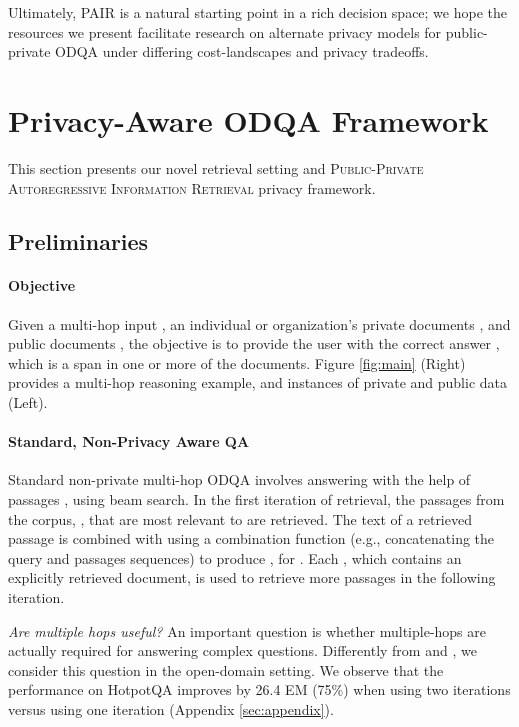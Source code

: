 \documentclass{article}
\renewcommand\cite{\citep}	\newcommand\shortcite{\citeyearpar}\newcommand\newcite{\citet}
\newcommand{\problemlongname}{\textsc{Public-Private Autoregressive Information Retrieval}\xspace}
\newcommand{\problemshortname}{\textsc{PAIR}\xspace}
\begin{document}
Ultimately, \problemshortname is a natural starting point in a rich decision space; we hope the resources we present facilitate research on alternate privacy models for public-private ODQA under differing cost-landscapes and privacy tradeoffs. 
 
\section{Privacy-Aware ODQA Framework}
\label{sec:method}
This section presents our novel retrieval setting and \problemlongname privacy framework.

\subsection{Preliminaries}
\paragraph{Objective} Given a multi-hop input , an individual or organization's private documents , and public documents , the objective is to provide the user with the correct answer , which is a span in one or more of the documents. Figure \ref{fig:main} (Right) provides a multi-hop reasoning example, and instances of private and public data (Left).

\paragraph{Standard, Non-Privacy Aware QA} Standard non-private multi-hop ODQA involves answering  with the help of passages , using beam search. In the first iteration of retrieval, the  passages from the corpus, , that are most relevant to  are retrieved. The text of a retrieved passage is combined with  using a combination function  (e.g., concatenating the query and passages sequences) to produce , for . Each , which contains an explicitly retrieved document, is used to retrieve  more passages in the following iteration. 


\textit{Are multiple hops useful?} An important question is whether multiple-hops are actually required for answering complex questions. Differently from \citet{min2019compmultihop} and \citet{chen2019multihopdesign}, we consider this question in the open-domain setting. We observe that the performance on HotpotQA \cite{yang2018hotpotqa} improves by 26.4 EM (75\%) when using two iterations versus using one iteration (Appendix \ref{sec:appendix}).
\end{document}
